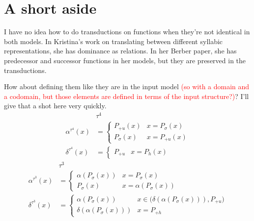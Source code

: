 \documentclass{article}
\begin{document}
\section{A short aside}
I have no idea how to do transductions on functions when they're not identical in both models. In Kristina's work on translating between different syllabic representations, she has dominance as relations. In her Berber paper, she has predecessor and successor functions in her models, but they are preserved in the transductions.\par
How about defining them like they are in the input model \textcolor{red}{(so with a domain and a codomain, but those elements are defined in terms of the input structure?)}? I'll give that a shot here very quickly.
\begin{equation}
\begin{split}
&\tau^4 \\
\alpha^{\tau^4}(x) &= \begin{cases} P_{+u}(x) & x = P_{\sigma}(x) \\
						   P_{\sigma}(x) & x = P_{+u}(x) \end{cases} \\
\delta^{\tau^4}(x) &= \begin{cases} P_{+u} & x = P_{h}(x) \end{cases} 
\end{split}
\end{equation}
\begin{equation}
\begin{split}
&\tau^3 \\
\alpha^{\tau^3}(x) &= \begin{cases} \alpha(P_{\sigma}(x)) & x = P_{\sigma}(x) \\
						   P_{\sigma}(x) & x = \alpha(P_{\sigma}(x)) \end{cases} \\
\delta^{\tau^3}(x) &= \begin{cases} \alpha(P_{\sigma}(x)) & x \in \Big( \delta(\alpha(P_{\sigma}(x))), P_{+u}\Big) \\ 
						   \delta(\alpha(P_{\sigma}(x))) & x = P_{+h} \end{cases}
\end{split}
\end{equation}
\end{document}
